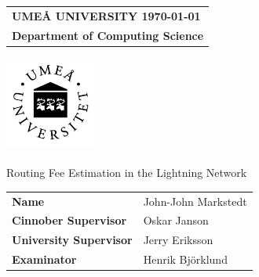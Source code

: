 \documentclass[a4paper, twocolumn, oneside]{book}
\title{\mytitle}
\author{John-John Markstedt}
\begin{document}
    \onecolumn
  
 	\setcounter{secnumdepth}{5}
	\begin{titlepage}

  	\thispagestyle{empty}
  	\begin{large}
  		\begin{tabular}{@{}p{\textwidth}@{}}
  			\textbf{UMEÅ UNIVERSITY \hfill \today} \\
  			\textbf{Department of Computing Science} \\
  			
  		\end{tabular}
  	\end{large}
  	\vspace{25mm}
  	\begin{center}
  		
  		\includegraphics[width=3.0cm]{umu-logo} \\

  		\huge{\textbf{\course}}\\
  		\vspace{10mm}
  		\LARGE{ Routing Fee Estimation in the Lightning Network } \\
  		\vspace{2mm}
	
		\begin{footnotesize}
		
		\end{footnotesize}

  		\vspace{10mm}
  		\begin{large}
  			\begin{tabular}{ll}
  				\textbf{Name} & John-John Markstedt \\
  				\textbf{Cinnober Supervisor} & Oskar Janson\\
  				\textbf{University Supervisor} & Jerry Eriksson\\
  				\textbf{Examinator} & Henrik Björklund\\
  			\end{tabular}
  			\vfill
  			\vfill			
  		\end{large}
  		
  	\end{center}
  \end{titlepage}
  
\end{document}
